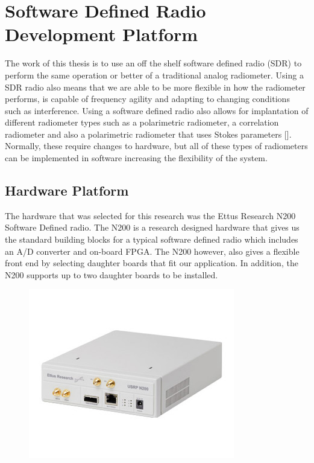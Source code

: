\section{Software Defined Radio Development Platform}
The work of this thesis is to use an off the shelf software defined radio (SDR) to perform the same operation or better of a traditional analog radiometer.  Using a SDR radio also means that we are able to be more flexible in how the radiometer performs, is capable of frequency agility and adapting to changing conditions such as interference.  Using a software defined radio also allows for implantation of different radiometer types such as a polarimetric radiometer, a correlation radiometer and also a polarimetric radiometer that uses Stokes parameters [\cite{Wang}].  Normally, these require changes to hardware, but all of these types of radiometers can be implemented in software increasing the flexibility of the system.  
\subsection{Hardware Platform}

The hardware that was selected for this research was the Ettus Research N200 Software Defined radio.  The N200 is a research designed hardware that gives us the standard building blocks for a typical software defined radio which includes an A/D converter and on-board FPGA.  The N200 however, also gives a flexible front end by selecting daughter boards that fit our application.  In addition, the N200 supports up to two daughter boards to be installed. 

{\begin{figure}[h!tb] 
\centering
\includegraphics{Images/n200}
\label{N200}
\end{figure}
}

